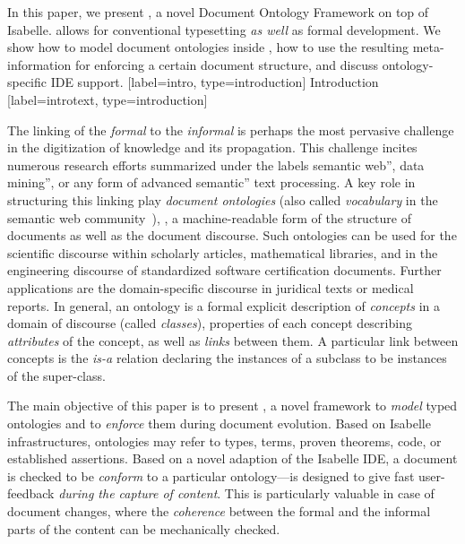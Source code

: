 \begin{isabellebody}
{In this paper, we present \isadof, a novel Document Ontology Framework
on top of Isabelle. \isadof allows for conventional typesetting
\emph{as well} as formal development. We show how to model document
 ontologies inside \isadof, how to use the resulting meta-information 
for enforcing a certain document structure, and discuss ontology-specific IDE support.}%
%
\isaDofSectionIntroduction%
%
[label={intro}, type={introduction}]%
{Introduction}%
%
\isaDofTextIntroduction%
%
[label={introtext}, type={introduction}]%
{
The linking of the \emph{formal} to the \emph{informal} is perhaps the
most pervasive challenge in the digitization of knowledge and its
propagation. This challenge incites numerous research efforts
summarized under the labels {\isacharbackquote}{\isacharbackquote}semantic web'', {\isacharbackquote}{\isacharbackquote}data mining'', or any
form of advanced {\isacharbackquote}{\isacharbackquote}semantic'' text processing.  A key role in
structuring this linking play \emph{document ontologies} (also called
\emph{vocabulary} in the semantic web
community~\cite{w3c:ontologies:2015}), \ie, a machine-readable form of
the structure of documents as well as the document discourse.
Such ontologies can be used for the scientific discourse within scholarly
articles, mathematical libraries, and in the engineering discourse  
of standardized software certification documents\cite{boulanger:cenelec-50128:2015,cc:cc-part3:2006}. 
Further applications are the domain-specific discourse in juridical texts or medical reports.  
In general, an ontology is a formal explicit description of \emph{concepts} 
in a domain of discourse (called \emph{classes}), properties of each concept 
describing \emph{attributes} of the concept, as well as \emph{links} between 
them. A particular link between concepts is the \emph{is-a} relation declaring 
the instances of a subclass to be instances of the super-class.

The main objective of this paper is to present \isadof, a novel
framework to \emph{model} typed ontologies and to \emph{enforce} them during
document evolution. Based on Isabelle infrastructures, ontologies may refer to
types, terms, proven theorems, code, or established assertions.
Based on a novel adaption of the Isabelle IDE, a document is checked to be 
\emph{conform} to a particular ontology---\isadof is
designed to give fast user-feedback \emph{during the capture of
content}. This is particularly valuable in case of document changes,
where the \emph{coherence} between the formal and the informal parts of the
content can be mechanically checked.

}
\end{isabellebody}
